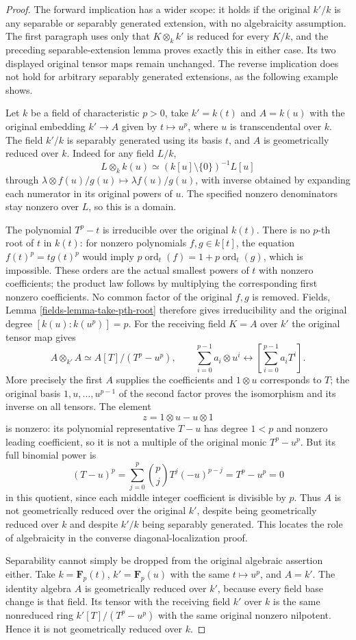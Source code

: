 \begin{proof}
\medskip\noindent
The forward implication has a wider scope:
it holds if the original $k'/k$ is any
separable or separably generated extension,
with no algebraicity assumption. The first
paragraph uses only that
$K\otimes_kk'$ is reduced for every $K/k$,
and the preceding separable-extension lemma
proves exactly this in either case. Its
two displayed original tensor maps remain
unchanged. The reverse implication does
not hold for arbitrary separably generated
extensions, as the following example shows.

Let $k$ be a field of characteristic $p>0$,
take $k'=k(t)$ and $A=k(u)$ with the
original embedding $k'\to A$ given by
$t\mapsto u^p$, where $u$ is transcendental
over $k$. The field $k'/k$ is separably
generated using its basis $t$, and $A$
is geometrically reduced over $k$.
Indeed for any field $L/k$,
$$
L\otimes_kk(u)\simeq
(k[u]\setminus\{0\})^{-1}L[u]
$$
through $\lambda\otimes f(u)/g(u)\mapsto
\lambda f(u)/g(u)$, with inverse obtained
by expanding each numerator in its
original powers of $u$. The specified
nonzero denominators stay nonzero over
$L$, so this is a domain.

The polynomial $T^p-t$ is irreducible
over the original $k(t)$. There is no
$p$-th root of $t$ in $k(t)$: for nonzero
polynomials $f,g\in k[t]$, the equation
$f(t)^p=tg(t)^p$ would imply
$p\operatorname{ord}_t(f)=1+p\operatorname{ord}_t(g)$,
which is impossible. These orders are the
actual smallest powers of $t$ with nonzero
coefficients; the product law follows by
multiplying the corresponding first
nonzero coefficients. No common factor
of the original $f,g$ is removed.
Fields, Lemma \ref{fields-lemma-take-pth-root}
therefore gives irreducibility and the
original degree $[k(u):k(u^p)]=p$.
For the receiving field $K=A$ over $k'$
the original tensor map gives
$$
A\otimes_{k'}A\simeq A[T]/(T^p-u^p),
\qquad \sum_{i=0}^{p-1}a_i\otimes u^i
\longleftrightarrow\left[\sum_{i=0}^{p-1}a_iT^i\right].
$$
More precisely the first $A$ supplies
the coefficients and $1\otimes u$
corresponds to $T$; the original basis
$1,u,\ldots,u^{p-1}$ of the second
factor proves the isomorphism and its
inverse on all tensors. The element
$$
z=1\otimes u-u\otimes1
$$
is nonzero: its polynomial representative
$T-u$ has degree $1<p$ and nonzero leading
coefficient, so it is not a multiple of
the original monic $T^p-u^p$.
But its full binomial power is
$$
(T-u)^p=\sum_{j=0}^p
\binom pj T^j(-u)^{p-j}=T^p-u^p=0
$$
in this quotient, since each middle
integer coefficient is divisible by $p$.
Thus $A$ is not geometrically reduced
over the original $k'$, despite being
geometrically reduced over $k$ and
despite $k'/k$ being separably generated.
This locates the role of algebraicity
in the converse diagonal-localization proof.

Separability cannot simply be dropped
from the original algebraic assertion
either. Take $k=\mathbf F_p(t)$,
$k'=\mathbf F_p(u)$ with the same
$t\mapsto u^p$, and $A=k'$.
The identity algebra $A$ is geometrically
reduced over $k'$, because every field
base change is that field. Its tensor
with the receiving field $k'$ over $k$
is the same nonreduced ring
$k'[T]/(T^p-u^p)$ with the same original
nonzero nilpotent. Hence it is not
geometrically reduced over $k$.
\end{proof}





